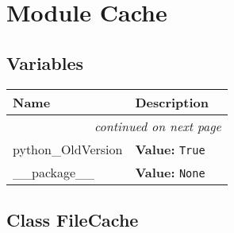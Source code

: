 %
%
%


\section{Module Cache}

    \label{Cache}


  \subsection{Variables}

    \vspace{-1cm}
\hspace{\varindent}\begin{longtable}{|p{\varnamewidth}|p{\vardescrwidth}|l}
\cline{1-2}
\cline{1-2} \centering \textbf{Name} & \centering \textbf{Description}& \\
\cline{1-2}
\endhead\cline{1-2}\multicolumn{3}{r}{\small\textit{continued on next page}}\\\endfoot\cline{1-2}
\endlastfoot\raggedright p\-y\-t\-h\-o\-n\-\_\-O\-l\-d\-V\-e\-r\-s\-i\-o\-n\- & \raggedright \textbf{Value:} 
{\tt True}&\\
\cline{1-2}
\raggedright \_\-\_\-p\-a\-c\-k\-a\-g\-e\-\_\-\_\- & \raggedright \textbf{Value:} 
{\tt None}&\\
\cline{1-2}
\end{longtable}



\subsection{Class FileCache}


